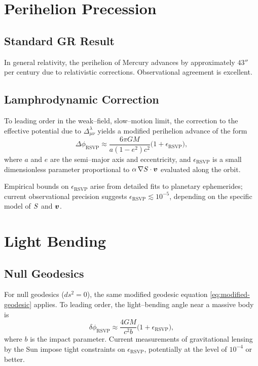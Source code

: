 \section{Perihelion Precession}

\subsection{Standard GR Result}

In general relativity, the perihelion of Mercury advances by approximately
$43''$ per century due to relativistic corrections. Observational agreement
is excellent.

\subsection{Lamphrodynamic Correction}

To leading order in the weak--field, slow--motion limit, the correction to
the effective potential due to $\Delta^\lambda_{\mu\nu}$ yields a modified
perihelion advance of the form
\[
  \Delta\phi_{\mathrm{RSVP}}
  \approx \frac{6\pi G M}{a(1-e^2)c^2}
  \bigl(1 + \epsilon_{\mathrm{RSVP}}\bigr),
\]
where $a$ and $e$ are the semi--major axis and eccentricity, and
$\epsilon_{\mathrm{RSVP}}$ is a small dimensionless parameter proportional
to $\alpha\,\nabla S \cdot \bm{v}$ evaluated along the orbit.

Empirical bounds on $\epsilon_{\mathrm{RSVP}}$ arise from detailed fits
to planetary ephemerides; current observational precision suggests
$\epsilon_{\mathrm{RSVP}} \lesssim 10^{-5}$, depending on the specific
model of $S$ and $\bm{v}$.

\section{Light Bending}

\subsection{Null Geodesics}

For null geodesics ($ds^2=0$), the same modified geodesic equation
\eqref{eq:modified-geodesic} applies. To leading order, the light--bending
angle near a massive body is
\[
  \delta\phi_{\mathrm{RSVP}}
  \approx \frac{4GM}{c^2 b}
  \bigl(1 + \epsilon_{\mathrm{RSVP}}\bigr),
\]
where $b$ is the impact parameter. Current measurements of gravitational
lensing by the Sun impose tight constraints on $\epsilon_{\mathrm{RSVP}}$,
potentially at the level of $10^{-4}$ or better.

